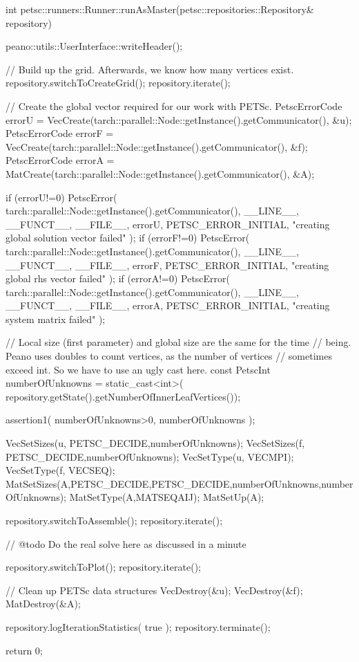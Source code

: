 \begin{code}
int petsc::runners::Runner::runAsMaster(petsc::repositories::Repository& repository) {
  peano::utils::UserInterface::writeHeader();

  // Build up the grid. Afterwards, we know how many vertices exist.
  repository.switchToCreateGrid(); repository.iterate();

  // Create the global vector required for our work with PETSc.
  PetscErrorCode errorU   = 
    VecCreate(tarch::parallel::Node::getInstance().getCommunicator(), &u);
  PetscErrorCode errorF = 
    VecCreate(tarch::parallel::Node::getInstance().getCommunicator(), &f);
  PetscErrorCode errorA   = 
    MatCreate(tarch::parallel::Node::getInstance().getCommunicator(), &A);

  if (errorU!=0) {
    PetscError( tarch::parallel::Node::getInstance().getCommunicator(),
      __LINE__,  __FUNCT__,  __FILE__, errorU,  PETSC_ERROR_INITIAL,
      "creating global solution vector failed" );
  }
  if (errorF!=0) {
    PetscError( tarch::parallel::Node::getInstance().getCommunicator(),
      __LINE__,  __FUNCT__,  __FILE__, errorF,  PETSC_ERROR_INITIAL,
      "creating global rhs vector failed" );
  }
  if (errorA!=0) {
    PetscError( tarch::parallel::Node::getInstance().getCommunicator(),
      __LINE__,  __FUNCT__,  __FILE__, errorA,  PETSC_ERROR_INITIAL,
      "creating system matrix failed" );
  }


  // Local size (first parameter) and global size are the same for the time
  // being. Peano uses doubles to count vertices, as the number of vertices
  // sometimes exceed int. So we have to use an ugly cast here.
  const PetscInt numberOfUnknowns = static_cast<int>(
    repository.getState().getNumberOfInnerLeafVertices());

  assertion1( numberOfUnknowns>0, numberOfUnknowns );

  VecSetSizes(u, PETSC_DECIDE,numberOfUnknowns);
  VecSetSizes(f, PETSC_DECIDE,numberOfUnknowns);
  VecSetType(u, VECMPI);
  VecSetType(f, VECSEQ);
  MatSetSizes(A,PETSC_DECIDE,PETSC_DECIDE,numberOfUnknowns,numberOfUnknowns);
  MatSetType(A,MATSEQAIJ);
  MatSetUp(A);
  
  repository.switchToAssemble(); repository.iterate();

  // @todo Do the real solve here as discussed in a minute

  repository.switchToPlot(); repository.iterate();

  // Clean up PETSc data structures
  VecDestroy(&u);
  VecDestroy(&f);
  MatDestroy(&A);

  repository.logIterationStatistics( true );
  repository.terminate();

  return 0;
}
\end{code}




